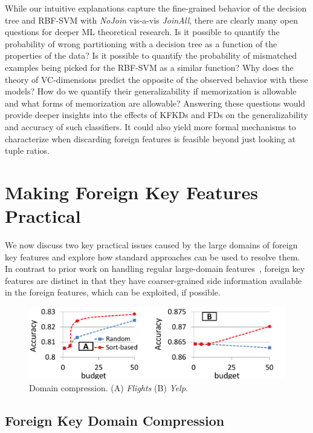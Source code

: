 \documentclass[sigconf]{acmart}
\begin{document}
While our intuitive explanations capture the fine-grained behavior of the decision tree and RBF-SVM with \textit{NoJoin} vis-a-vis \textit{JoinAll}, there are clearly many 
open questions for deeper ML theoretical research. Is it possible to quantify the probability of wrong partitioning with a decision tree as a function of the properties of 
the data? Is it possible to quantify the probability of mismatched examples being picked for the RBF-SVM as a similar function? Why does the theory of VC-dimensions predict 
the opposite of the observed behavior with these models? How do we quantify their generalizability if memorization is allowable and what forms of memorization are allowable?
Answering these questions would provide deeper insights into the effects of KFKDs and FDs on the generalizability and accuracy of such classifiers. It could also yield more 
formal mechanisms to characterize when discarding foreign features is feasible beyond just looking at tuple ratios.


\section{Making Foreign Key Features Practical}

We now discuss two key practical issues caused by the large domains of foreign key features and explore how standard approaches can be used to resolve them. 
In contrast to prior work on handling regular large-domain features~\cite{dtreebias1}, foreign key features are distinct in that they have coarser-grained 
side information available in the foreign features, which can be exploited, if possible.

\begin{figure}
\centering
\includegraphics[width=0.99\linewidth]{dom_comp.pdf}
\vspace{-2mm}
\caption{Domain compression. (A) \textit{Flights} (B) \textit{Yelp}.}
\label{Figure:Compression}
\vspace{-2mm}
\end{figure}

\subsection{Foreign Key Domain Compression}
\end{document}
